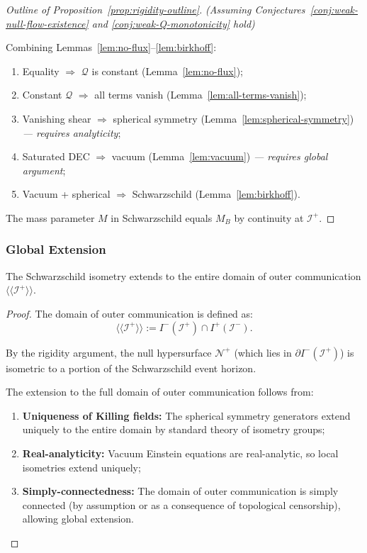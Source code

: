 \begin{proof}[Outline of Proposition~\ref{prop:rigidity-outline}]
\textit{(Assuming Conjectures~\ref{conj:weak-null-flow-existence} and \ref{conj:weak-Q-monotonicity} hold)}

Combining Lemmas~\ref{lem:no-flux}--\ref{lem:birkhoff}:
\begin{enumerate}
\item Equality $\Rightarrow$ $\mathcal{Q}$ is constant (Lemma~\ref{lem:no-flux});
\item Constant $\mathcal{Q}$ $\Rightarrow$ all terms vanish (Lemma~\ref{lem:all-terms-vanish});
\item Vanishing shear $\Rightarrow$ spherical symmetry (Lemma~\ref{lem:spherical-symmetry}) \textit{--- requires analyticity};
\item Saturated DEC $\Rightarrow$ vacuum (Lemma~\ref{lem:vacuum}) \textit{--- requires global argument};
\item Vacuum + spherical $\Rightarrow$ Schwarzschild (Lemma~\ref{lem:birkhoff}).
\end{enumerate}

The mass parameter $M$ in Schwarzschild equals $M_B$ by continuity at $\mathscr{I}^+$.
\end{proof}

\subsubsection{Global Extension}

\begin{proposition}
\label{prop:global-extension}
The Schwarzschild isometry extends to the entire domain of outer communication $\langle\!\langle \mathscr{I}^+ \rangle\!\rangle$.
\end{proposition}

\begin{proof}
The domain of outer communication is defined as:
\begin{equation}
\langle\!\langle \mathscr{I}^+ \rangle\!\rangle := I^-(\mathscr{I}^+) \cap I^+(\mathscr{I}^-).
\end{equation}

By the rigidity argument, the null hypersurface $\mathcal{N}^+$ (which lies in $\partial I^-(\mathscr{I}^+)$) is isometric to a portion of the Schwarzschild event horizon.

The extension to the full domain of outer communication follows from:
\begin{enumerate}
\item \textbf{Uniqueness of Killing fields:} The spherical symmetry generators extend uniquely to the entire domain by standard theory of isometry groups;
\item \textbf{Real-analyticity:} Vacuum Einstein equations are real-analytic, so local isometries extend uniquely;
\item \textbf{Simply-connectedness:} The domain of outer communication is simply connected (by assumption or as a consequence of topological censorship), allowing global extension.
\end{enumerate}
\end{proof}

